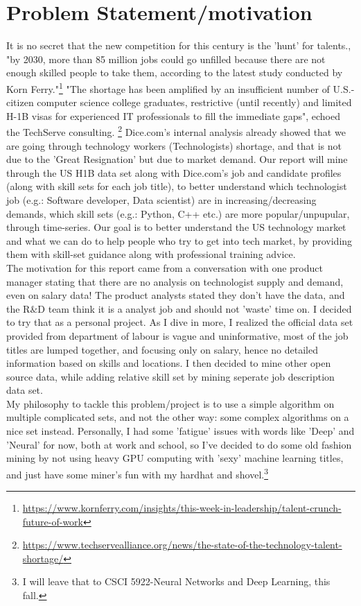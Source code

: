 \section{ Problem Statement/motivation}
 It is no secret that the new competition for this century is the 'hunt' for talents., "by 2030, more than 85 million jobs could go unfilled because there are not enough skilled people to take them, according to the latest study conducted by Korn Ferry."\footnote{ \url{https://www.kornferry.com/insights/this-week-in-leadership/talent-crunch-future-of-work}} "The shortage has been amplified by an insufficient number of U.S.-citizen computer science college graduates, restrictive (until recently) and limited H-1B visas for experienced IT professionals to fill the immediate gaps",  echoed the TechServe consulting. \footnote{ \url{https://www.techservealliance.org/news/the-state-of-the-technology-talent-shortage/}}
Dice.com's internal analysis already showed that we are going through technology workers (Technologists) shortage, and that is not due to the 'Great Resignation' but due to market demand. Our report will mine through the US H1B data set along with Dice.com's job and candidate profiles (along with skill sets for each job title),  to better understand which technologist job (e.g.: Software developer, Data scientist) are in increasing/decreasing demands, which skill sets (e.g.: Python, C++ etc.) are more popular/unpupular, through time-series. Our goal is to better understand the US technology market and what we can do to help people who try to get into tech market, by providing them with skill-set guidance along with professional training advice. \\
The motivation for this report came from a conversation with one product manager stating that there are no analysis on technologist supply and demand, even on salary data! The product analysts stated they don't have the data, and the R$\&$D team think it is a analyst job and should not 'waste' time on.  I decided to try that as a personal project. As I dive in more, I realized the official data set provided from department of labour is vague and uninformative, most of the job titles are lumped together, and focusing only on salary, hence no detailed information based on skills and locations. I then decided to mine other open source data, while adding relative skill set by mining seperate job description data set.\\
My philosophy to tackle this problem/project is to use a simple algorithm on multiple complicated sets, and not the other way: some complex algorithms  on a nice set instead. Personally, I had some 'fatigue' issues with words like 'Deep' and 'Neural' for now, both at work and school, so I've decided to do some old fashion mining by not using heavy GPU computing with 'sexy' machine learning titles, and just have some miner's fun with my hardhat and shovel.\footnote{I will leave that to CSCI 5922-Neural Networks and Deep Learning, this fall.}
